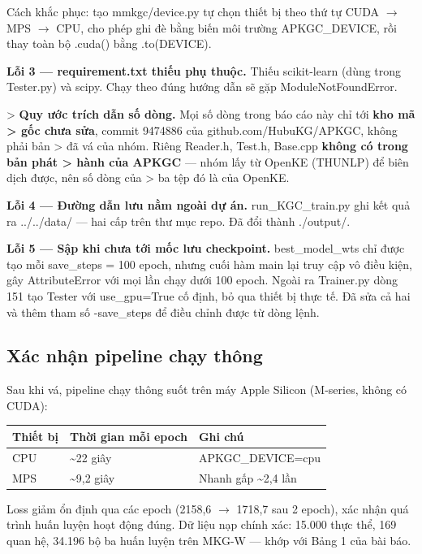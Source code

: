 \documentclass[11pt,a4paper]{article}
\newcommand{\code}[1]{{\ttfamily\small\color{codetext}#1}}
\begin{document}
Cách khắc phục: tạo \code{mmkgc/device.py} tự chọn thiết bị theo thứ tự CUDA $\rightarrow$ MPS $\rightarrow$ CPU, cho phép ghi đè bằng biến môi trường \code{APKGC\_DEVICE}, rồi thay toàn bộ \code{.cuda()} bằng \code{.to(DEVICE)}.

\textbf{Lỗi 3 --- \code{requirement.txt} thiếu phụ thuộc.} Thiếu \code{scikit-learn} (dùng trong \code{Tester.py}) và \code{scipy}. Chạy theo đúng hướng dẫn sẽ gặp \code{ModuleNotFoundError}.

> \textbf{Quy ước trích dẫn số dòng.} Mọi số dòng trong báo cáo này chỉ tới \textbf{kho mã > gốc chưa sửa}, commit \code{9474886} của \code{github.com/HubuKG/APKGC}, không phải bản > đã vá của nhóm. Riêng \code{Reader.h}, \code{Test.h}, \code{Base.cpp} \textbf{không có trong bản phát > hành của APKGC} --- nhóm lấy từ OpenKE (THUNLP) để biên dịch được, nên số dòng của > ba tệp đó là của OpenKE.

\textbf{Lỗi 4 --- Đường dẫn lưu nằm ngoài dự án.} \code{run\_KGC\_train.py} ghi kết quả ra \code{../../data/} --- hai cấp trên thư mục repo. Đã đổi thành \code{./output/}.

\textbf{Lỗi 5 --- Sập khi chưa tới mốc lưu checkpoint.} \code{best\_model\_wts} chỉ được tạo mỗi \code{save\_steps = 100} epoch, nhưng cuối hàm \code{main} lại truy cập vô điều kiện, gây \code{AttributeError} với mọi lần chạy dưới 100 epoch. Ngoài ra \code{Trainer.py} dòng 151 tạo \code{Tester} với \code{use\_gpu=True} cố định, bỏ qua thiết bị thực tế. Đã sửa cả hai và thêm tham số \code{-save\_steps} để điều chỉnh được từ dòng lệnh.

\subsection{Xác nhận pipeline chạy thông}
Sau khi vá, pipeline chạy thông suốt trên máy Apple Silicon (M-series, không có CUDA):

\begin{center}\small
\begin{tabular}{@{}lll@{}}
\toprule
\textbf{Thiết bị} & \textbf{Thời gian mỗi epoch} & \textbf{Ghi chú}\\
\midrule
CPU & \textasciitilde{}22 giây & \code{APKGC\_DEVICE=cpu}\\
MPS & \textasciitilde{}9,2 giây & Nhanh gấp \textasciitilde{}2,4 lần\\
\bottomrule
\end{tabular}
\end{center}
Loss giảm ổn định qua các epoch (2158,6 $\rightarrow$ 1718,7 sau 2 epoch), xác nhận quá trình huấn luyện hoạt động đúng. Dữ liệu nạp chính xác: 15.000 thực thể, 169 quan hệ, 34.196 bộ ba huấn luyện trên MKG-W --- khớp với Bảng 1 của bài báo.
\end{document}

